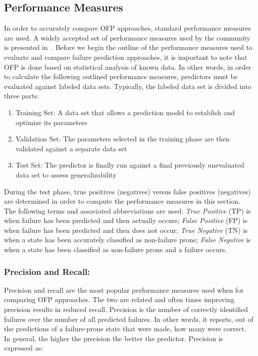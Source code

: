 \subsection{Performance Measures} \label{metrics}
In order to accurately compare OFP approaches, standard performance measures 
are used.  A widely accepted set of performance measures used by the
community is presented in~\cite{salfnerSurvey}.  Before we begin the outline of
the performance measures used to evaluate and compare failure prediction
approaches, it is important to note that OFP is done based on statistical
analysis of known data.  In other words, in order to calculate the following
outlined performance measures, predictors must be evaluated against labeled
data sets.  Typically, the labeled data set is divided into three parts:
\begin{enumerate}
\item{Training Set:  A data set that allows a prediction model to establish and
optimize its parameters}
\item{Validation Set:  The parameters selected in the training phase are then
validated against a separate data set}
\item{Test Set:  The predictor is finally run against a final previously
unevaluated data set to assess generalizability}
\end{enumerate}
During the test phase, true positives (negatives) versus false positives
(negatives) are determined in order to compute the performance measures in
this section.  The following terms and associated abbreviations are used:
\emph{True Positive} (TP) is when failure has been predicted and then actually
occurs; \emph{False Positive} (FP) is when failure has been predicted and then
does not occur; \emph{True Negative} (TN) is when a state has been accurately
classified as non-failure prone; \emph{False Negative} is when a state has been
classified as non-failure prone and a failure occurs.

\subsubsection{Precision and Recall:}
Precision and recall are the most popular performance measures used when
for comparing OFP approaches.  The two are related and often times
improving precision results in reduced recall.  Precision is the number of
correctly identified failures over the number of all predicted failures.  In
other words, it reports, out of the predictions of a failure-prone state that
were made, how many were correct.  In general, the higher the precision the
better the predictor.  Precision is expressed as:

